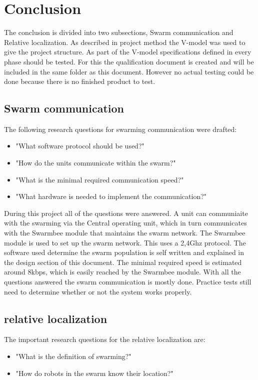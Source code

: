 \documentclass[10pt,a4paper]{article}
\begin{document}
\section{Conclusion}
The conclusion is divided into two subsections, Swarm communication and Relative localization. As described in project method the V-model was used to give the project structure. As part of the V-model specifications defined in every phase should be tested. For this the qualification document is created and will be included in the same folder as this document. However no actual testing could be done because there is no finished product to test.

\subsection{Swarm communication}
The following research questions for swarming communication were drafted:
   
    \begin{itemize}
        \item "What software protocol should be used?"
        \item "How do the units communicate within the swarm?"
        \item "What is the minimal required communication speed?"
        \item "What hardware is needed to implement the communication?"
    \end{itemize}
    
During this project all of the questions were answered. A unit can communiaite with the swarming via the Central operating unit, which in turn communicates with the Swarmbee module that maintains the swarm network. The Swarmbee module is used to set up the swarm network. This uses a 2,4Ghz protocol. The software used determine the swarm population is self written and explained in the design section of this document. The minimal required speed is estimated around 8kbps, which is easily reached by the Swarmbee module. With all the questions answered the swarm communication is mostly done. Practice tests still need to determine whether or not the system works properly.

\subsection{relative localization} 
The important research questions for the relative localization are:

    \begin{itemize}
        \item "What is the definition of swarming?"
        \item "How do robots in the swarm know their location?"
    \end{itemize}
\end{document}
